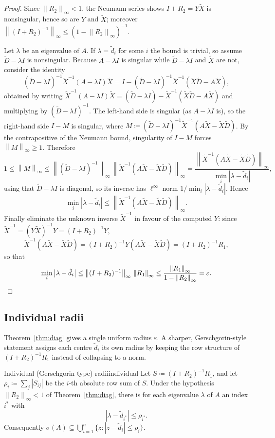 \documentclass[11pt, a4paper]{article}
\numberwithin{equation}{section}
\newcommand{\norm}[1]{\left\|#1\right\|}
\newcommand{\abs}[1]{\left|#1\right|}
\newcommand{\tX}{\widetilde{X}}
\newcommand{\tD}{\widetilde{D}}
\begin{document}
\begin{proof}
Since $\norm{R_2}_\infty < 1$, the Neumann series shows $I + R_2 = Y\tX$ is
nonsingular, hence so are $Y$ and $\tX$; moreover $\norm{(I+R_2)^{-1}}_\infty
\le (1 - \norm{R_2}_\infty)^{-1}$.

Let $\lambda$ be an eigenvalue of $A$.  If $\lambda = \tilde d_i$ for some $i$
the bound is trivial, so assume $\tD - \lambda I$ is nonsingular.  Because $A -
\lambda I$ is singular while $\tD - \lambda I$ and $\tX$ are not, consider the
identity
\[
  (\tD - \lambda I)^{-1}\tX^{-1}(A - \lambda I)\tX
    = I - (\tD - \lambda I)^{-1}\tX^{-1}(\tX\tD - A\tX),
\]
obtained by writing $\tX^{-1}(A-\lambda I)\tX = (\tD - \lambda I) - \tX^{-1}(\tX\tD
- A\tX)$ and multiplying by $(\tD - \lambda I)^{-1}$.  The left-hand side is
singular (as $A - \lambda I$ is), so the right-hand side $I - M$ is singular,
where $M \coloneqq (\tD - \lambda I)^{-1}\tX^{-1}(A\tX - \tX\tD)$.  By the
contrapositive of the Neumann bound, singularity of $I - M$ forces
$\norm{M}_\infty \ge 1$.  Therefore
\[
  1 \le \norm{M}_\infty
    \le \norm{(\tD - \lambda I)^{-1}}_\infty\,\norm{\tX^{-1}(A\tX - \tX\tD)}_\infty
    = \frac{\norm{\tX^{-1}(A\tX - \tX\tD)}_\infty}{\min_i \abs{\lambda - \tilde d_i}},
\]
using that $\tD - \lambda I$ is diagonal, so its inverse has $\ell^\infty$ norm
$1/\min_i\abs{\lambda - \tilde d_i}$.  Hence
\[
  \min_i\abs{\lambda - \tilde d_i}
    \le \norm{\tX^{-1}(A\tX - \tX\tD)}_\infty.
\]
Finally eliminate the unknown inverse $\tX^{-1}$ in favour of the computed $Y$:
since $\tX^{-1} = (Y\tX)^{-1}Y = (I + R_2)^{-1}Y$,
\[
  \tX^{-1}(A\tX - \tX\tD) = (I+R_2)^{-1}Y(A\tX - \tX\tD) = (I + R_2)^{-1}R_1,
\]
so that
\[
  \min_i\abs{\lambda - \tilde d_i}
    \le \norm{(I+R_2)^{-1}}_\infty\,\norm{R_1}_\infty
    \le \frac{\norm{R_1}_\infty}{1 - \norm{R_2}_\infty} = \varepsilon. \qedhere
\]
\end{proof}

\subsection{Individual radii}

Theorem~\ref{thm:diag} gives a single uniform radius $\varepsilon$.  A sharper,
Gerschgorin-style statement assigns each centre $\tilde d_i$ its own radius by
keeping the row structure of $(I+R_2)^{-1}R_1$ instead of collapsing to a norm.

\begin{corollary}{Individual (Gerschgorin-type) radii}{individual}
  Let $S \coloneqq (I + R_2)^{-1} R_1$, and let $\rho_i \coloneqq \sum_{j}
  \abs{S_{ij}}$ be the $i$-th absolute row sum of $S$.  Under the hypothesis
  $\norm{R_2}_\infty < 1$ of Theorem~\textup{\ref{thm:diag}}, there is for each
  eigenvalue $\lambda$ of $A$ an index $i^*$ with
  \[
    \abs{\lambda - \tilde d_{i^*}} \le \rho_{i^*}.
  \]
  Consequently $\sigma(A) \subseteq \bigcup_{i=1}^n \{ z : \abs{z - \tilde d_i}
  \le \rho_i \}$.
\end{corollary}
\end{document}
